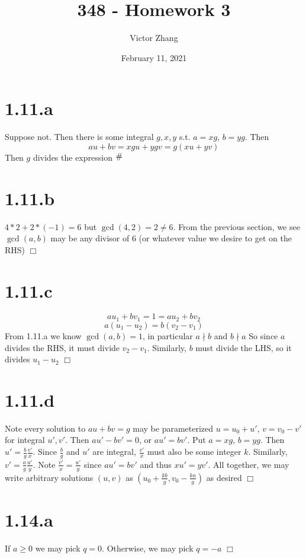 \documentclass{article}
\title{348 - Homework 3}
\author{Victor Zhang}
\date{February 11, 2021}
\newcommand{\contra}{\raisebox{\depth}{\#}}
\begin{document}
\maketitle

\section*{1.11.a}
Suppose not. Then there is some integral $g,x,y$ s.t. $a = xg$, $b = yg$. Then
$$au + bv = xgu + ygv = g(xu+yv)$$
Then $g$ divides the expression $\contra$

\section*{1.11.b}
$4*2 + 2*(-1) = 6$ but $\gcd(4,2) = 2 \neq 6$. From the previous section, we see $\gcd(a,b)$ may be any divisor of 6 (or whatever value we desire to get on the RHS) $\Box$

\section*{1.11.c}
$$au_1+bv_1 = 1 = au_2 + bv_2$$
$$a(u_1-u_2) = b(v_2-v_1)$$
From 1.11.a we know $\gcd(a,b) = 1$, in particular $a \nmid b$ and $b \nmid a$ So since $a$ divides the RHS, it must divide $v_2-v_1$. Similarly, $b$ must divide the LHS, so it divides $u_1-u_2$ $\Box$

\section*{1.11.d}
Note every solution to $au+bv = g$ may be parameterized $u = u_0 + u'$, $v = v_0 - v'$ for integral $u',v'$. Then $au' - bv' = 0$, or $au' = bv'$. Put $a = xg$, $b = yg$. Then $u' = \frac{b}{g}\frac{v'}{x}$. Since $\frac{b}{g}$ and $u'$ are integral, $\frac{v'}{x}$ must also be some integer $k$. Similarly, $v' = \frac{a}{g}\frac{u'}{y}$. Note $\frac{v'}{x} = \frac{u'}{y}$ since $au' = bv'$ and thus $xu' = yv'$. All together, we may write arbitrary solutions $(u,v)$ as $(u_0 + \frac{kb}{g}, v_0 - \frac{ka}{g})$ as desired $\Box$

\section*{1.14.a}
If $a \geqslant 0$ we may pick $q = 0$. Otherwise, we may pick $q = -a$ $\Box$
\end{document}
